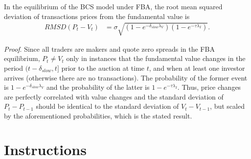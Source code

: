 \documentclass[12pt]{article}
\begin{document}
\begin{appendices}
\begin{proposition} \label{rmsdFBA}
In the equilibrium of the BCS model under FBA, the root mean squared deviation of transactions prices from the fundamental value is
\begin{align}
RMSD(P_t-V_t) & = \sigma \sqrt{ \left(1-e^{-\delta_{slow} \lambda_V}\right)  \left( 1-e^{-\tau \lambda_I} \right)}. \label{rmsdFBAEq}
\end{align}
\end{proposition}

\noindent \emph{Proof}. Since all traders are makers and quote zero spreads in the FBA equilibrium, $P_t \neq V_t$ only in instances that the fundamental value changes in the period $(t-\delta_{slow},t]$ prior to the auction at time $t$, and when at least one investor arrives (otherwise there are no transactions). The probability of the former event is $1-e^{-\delta_{slow} \lambda_V}$ and the probability of the latter is $1-e^{-\tau \lambda_I}$. Thus, price changes are perfectly correlated with value changes and the standard deviation of $P_t -P_{t-1}$ should be identical to the standard deviation of $V_t-V_{t-1}$, but scaled by the aforementioned probabilities, which is the stated result.

\section{Instructions}
\label{sec:instructions}





\end{appendices}
\end{document}
